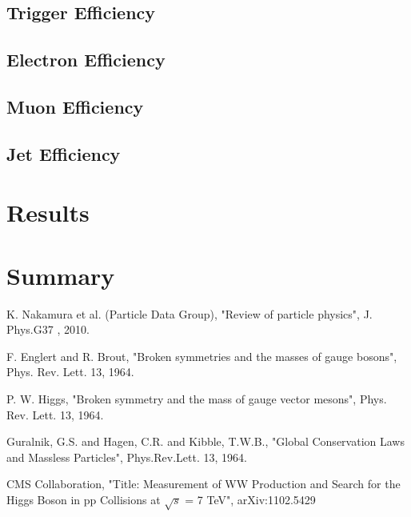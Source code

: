 \documentclass{cmspaper}
\begin{document}
   \subsection{Trigger Efficiency}
      
   \subsection{Electron Efficiency}
   \subsection{Muon Efficiency}
   \subsection{Jet Efficiency}
      

\clearpage
\section{Results}
  \label{sec:results}
  

\section{Summary}
    \label{sec:summary}
%    

\clearpage

\vspace*{-0.2cm}

 K. Nakamura et al. (Particle Data Group), "Review of particle physics", J. Phys.G37 , 2010.

F. Englert and R. Brout, "Broken symmetries and the masses of gauge bosons", Phys. Rev. Lett. 13,  1964.

P. W. Higgs, "Broken symmetry and the mass of gauge vector mesons", Phys. Rev. Lett. 13, 1964.

Guralnik, G.S. and Hagen, C.R. and Kibble, T.W.B., "Global Conservation Laws and Massless Particles", 
Phys.Rev.Lett. 13, 1964.

CMS Collaboration, "Title: Measurement of WW Production and Search for the Higgs Boson in 
pp Collisions at $\sqrt{s}$ = 7 TeV", arXiv:1102.5429
\end{document}
